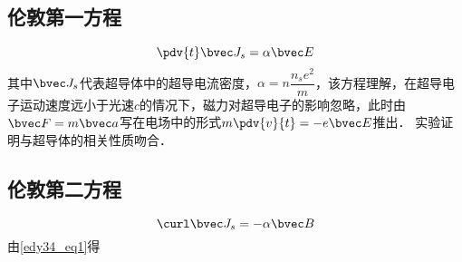 \subsection{伦敦第一方程}
\begin{equation}
\pdv{t}\bvec J_s=\alpha\bvec E \label{edy34_eq1}
\end{equation}
其中$\bvec J_s$代表超导体中的超导电流密度，$\alpha=n\dfrac {n_se^2}m$，该方程理解，在超导电子运动速度远小于光速$c$的情况下，磁力对超导电子的影响忽略，此时由$\bvec F=m \bvec a$写在电场中的形式$m\pdv{v}{t}=-e\bvec E$推出．
实验证明与超导体的相关性质吻合．
\subsection{伦敦第二方程}
\begin{equation}
\curl\bvec J_s=-\alpha\bvec B
\end{equation}
由\autoref{edy34_eq1}得